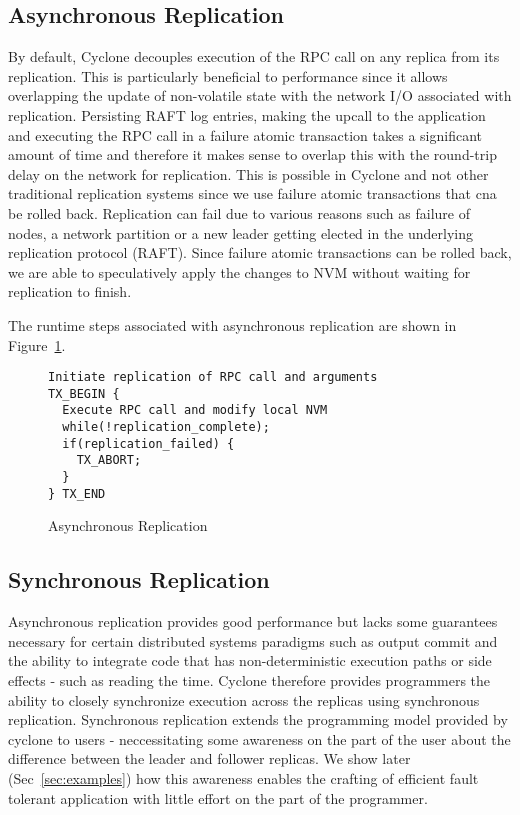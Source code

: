 \documentclass[twocolumn]{article}
\begin{document}
\subsection{Asynchronous Replication}
By default, Cyclone decouples execution of the RPC call on any replica from its
replication. This is particularly beneficial to performance since it allows
overlapping the update of non-volatile state with the network I/O associated
with replication. Persisting RAFT log entries, making the upcall to the
application and executing the RPC call in a failure atomic transaction takes a
significant amount of time and therefore it makes sense to overlap this with the
round-trip delay on the network for replication. This is possible in Cyclone and
not other traditional replication systems since we use failure atomic
transactions that cna be rolled back. Replication can fail due to various
reasons such as failure of nodes, a network partition or a new leader getting
elected in the underlying replication protocol (RAFT). Since failure atomic
transactions can be rolled back, we are able to speculatively apply the changes
to NVM without waiting for replication to finish.

The runtime steps associated with asynchronous replication are shown in
Figure~\ref{fig:async_rep}.

\begin{figure}
{\scriptsize
\begin{verbatim}
Initiate replication of RPC call and arguments
TX_BEGIN {
  Execute RPC call and modify local NVM
  while(!replication_complete);
  if(replication_failed) {
    TX_ABORT;
  }
} TX_END
\end{verbatim}
}
\caption{Asynchronous Replication}
\label{fig:async_rep}
\end{figure}

\subsection{Synchronous Replication}
Asynchronous replication provides good performance but lacks some guarantees
necessary for certain distributed systems paradigms such as output commit and
the ability to integrate code that has non-deterministic execution paths or side
effects - such as reading the time. Cyclone therefore provides programmers the
ability to closely synchronize execution across the replicas using synchronous
replication. Synchronous replication extends the programming model provided by
cyclone to users - neccessitating some awareness on the part of the user about
the difference between the leader and follower replicas. We show later
(Sec~\ref{sec:examples}) how this awareness enables the crafting of efficient
fault tolerant application with little effort on the part of the programmer.
\end{document}
